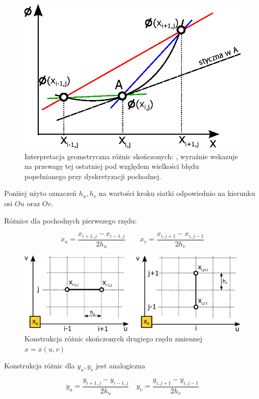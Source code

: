 \begin{figure}[H]
	\centering
    \includegraphics[width=0.6\linewidth]{Rysunki/roznice_skonczone_interpretacja.eps}
  \caption{Interpretacja geometryczna różnic skończonych: \color{blue}{przedniej}, \color{green}{wstecznej} \color{black}{oraz} \color{red}{centralnej} \color{black} wyraźnie wskazuje na przewagę tej ostatniej pod względem wielkości błędu popełnianego przy dyskretyzacji pochodnej.
	\label{fig:roznice_interpretacja}}
\end{figure}

\noindent Poniżej użyto oznaczeń $h_u, h_v$ na wartości kroku siatki odpowiednio na kierunku osi $Ou$ oraz $Ov$. \newline

\noindent Różnice dla pochodnych pierwszego rzędu:

\[
x_u = \frac{x_{i+1,j}-x_{i-1,j}}{2h_u} \quad\quad
 x_v = \frac{x_{i,j+1}-x_{i,j-1}}{2h_v}
\]

\begin{figure}[H]
	\centering
    \includegraphics[width=\linewidth]{Rysunki/roznice_skonczone_x.eps}
	\caption{Konstrukcja różnic skończonych drugiego rzędu zmiennej \mbox{$x=x(u,v)$}
	\label{fig:roznice_skonczone_x}}
\end{figure}

\noindent Konstrukcja różnic dla $y_u, y_v$ jest analogiczna

\[
y_u = \frac{y_{i+1,j}-y_{i-1,j}}{2h_u} \quad y_v = \frac{y_{i,j+1}-y_{i,j-1}}{2h_v}
\]

